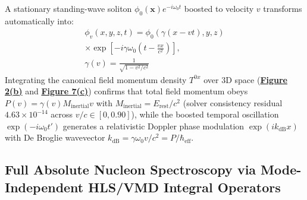 \documentclass[10pt,aps,prd,twocolumn,superscriptaddress,nofootinbib,floatfix,longbibliography,showkeys]{revtex4-2}
\begin{document}
A stationary standing-wave soliton $\phi_0(\mathbf{x})e^{-i\omega_0 t}$ boosted to velocity $v$ transforms automatically into:
\begin{equation}\begin{gathered}
\phi_v(x, y, z, t) = \phi_0\!\left(\gamma(x - vt), y, z\right) \\
\times \exp\!\left[-i\gamma\omega_0\!\left(t - \frac{v x}{c^2}\right)\right], \\
\gamma(v) = \frac{1}{\sqrt{1 - v^2/c^2}}
\end{gathered}\end{equation}
Integrating the canonical field momentum density $T^{0x}$ over 3D space (\textbf{\hyperref[fig:fig2]{Figure 2(b)}} and \textbf{\hyperref[fig:fig7]{Figure 7(c)}}) confirms that total field momentum obeys $P(v) = \gamma(v) M_{\text{inertial}} v$ with $M_{\text{inertial}} = E_{\text{rest}}/c^2$ (solver consistency residual $4.63 \times 10^{-14}$ across $v/c \in [0, 0.90]$), while the boosted temporal oscillation $\exp(-i\omega_0 t')$ generates a relativistic Doppler phase modulation $\exp(i k_{\text{dB}} x)$ with De Broglie wavevector $k_{\text{dB}} = \gamma \omega_0 v / c^2 = P / \hbar_{\text{eff}}$.


\subsection{Full Absolute Nucleon Spectroscopy via Mode-Independent HLS/VMD Integral Operators}\label{sec:4.3}
\end{document}
